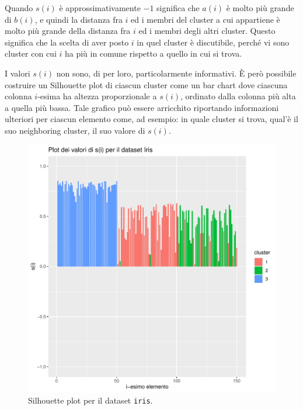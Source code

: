 \documentclass[a4paper, 12pt]{report}
\begin{document}
			Quando $s(i)$ è approssimativamente $-1$ significa che $a(i)$ è molto
			più grande di $b(i)$, e quindi la distanza fra $i$ ed i membri del
			cluster a cui appartiene è molto più grande della distanza fra $i$
			ed i membri degli altri cluster. Questo significa che la scelta di
			aver posto $i$ in quel cluster è discutibile, perché vi sono cluster
			con cui $i$ ha più in comune rispetto a quello in cui si trova.


			I valori $s(i)$ non sono, di per loro, particolarmente informativi.
			È però possibile costruire un Silhouette plot di ciascun cluster
			come un bar chart dove ciascuna colonna $i$-esima ha altezza
			proporzionale a $s(i)$, ordinato dalla colonna più alta a quella
			più bassa. Tale grafico può essere arricchito riportando informazioni
			ulteriori per ciascun elemento come, ad esempio: in quale cluster si
			trova, qual'è il suo neighboring cluster, il suo valore di $s(i)$.

			\begin{figure}[H]
				\includegraphics[width = \textwidth]{doc/si.pdf}
				\caption{Silhouette plot per il dataset \texttt{iris}.}
				\label{fig:si}
			\end{figure}
\end{document}
